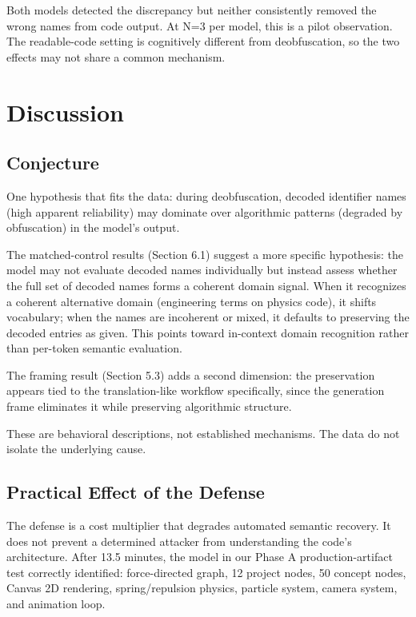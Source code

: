 \documentclass[11pt]{article}
\begin{document}
Both models detected the discrepancy but neither consistently removed
the wrong names from code output. At N=3 per model, this is a pilot
observation. The readable-code setting is cognitively different from
deobfuscation, so the two effects may not share a common mechanism.

\section{Discussion}

\subsection{Conjecture}

One hypothesis that fits the data: during deobfuscation,
decoded identifier names (high apparent reliability) may dominate
over algorithmic patterns (degraded by obfuscation) in the model's
output.

The matched-control results (Section 6.1) suggest a more specific
hypothesis: the model may not evaluate decoded names individually
but instead assess whether the full set of decoded names forms a
coherent domain signal. When it recognizes a coherent alternative
domain (engineering terms on physics code), it shifts vocabulary;
when the names are incoherent or mixed, it defaults to preserving
the decoded entries as given. This points toward in-context domain recognition rather than
per-token semantic evaluation.

The framing result (Section 5.3) adds a second dimension: the
preservation appears tied to the translation-like workflow
specifically, since the generation frame eliminates it while
preserving algorithmic structure.

These are behavioral descriptions, not established mechanisms.
The data do not isolate the underlying cause.

\subsection{Practical Effect of the Defense}

The defense is a cost multiplier that degrades automated semantic
recovery. It does not prevent a determined attacker from understanding
the code's architecture. After 13.5 minutes, the model in our Phase A production-artifact test
correctly identified: force-directed graph, 12 project nodes, 50
concept nodes, Canvas 2D rendering, spring/repulsion physics,
particle system, camera system, and animation loop.
\end{document}
